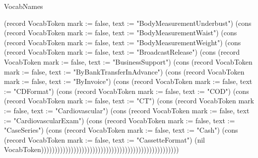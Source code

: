 \begin{lexlean}{VocabNames}
\begin{semanticmodule}
{(record VocabToken {mark := false, text := "BodyMeasurementUnderbust"}) (cons (record VocabToken {mark := false, text := "BodyMeasurementWaist"}) (cons (record VocabToken {mark := false, text := "BodyMeasurementWeight"}) (cons (record VocabToken {mark := false, text := "BroadcastRelease"}) (cons (record VocabToken {mark := false, text := "BusinessSupport"}) (cons (record VocabToken {mark := false, text := "ByBankTransferInAdvance"}) (cons (record VocabToken {mark := false, text := "ByInvoice"}) (cons (record VocabToken {mark := false, text := "CDFormat"}) (cons (record VocabToken {mark := false, text := "COD"}) (cons (record VocabToken {mark := false, text := "CT"}) (cons (record VocabToken {mark := false, text := "Cardiovascular"}) (cons (record VocabToken {mark := false, text := "CardiovascularExam"}) (cons (record VocabToken {mark := false, text := "CaseSeries"}) (cons (record VocabToken {mark := false, text := "Cash"}) (cons (record VocabToken {mark := false, text := "CassetteFormat"}) (nil VocabToken)))))))))))))))))))))))))))))))))))))))))))))))))))
}


\end{semanticmodule}
\end{lexlean}
